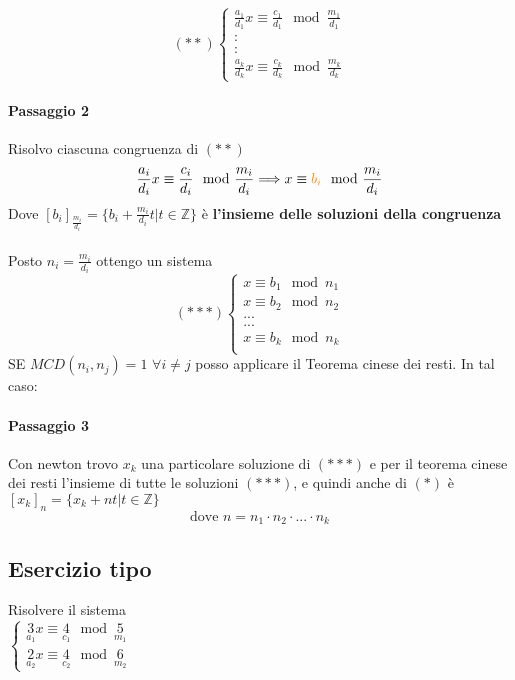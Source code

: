 $$(**)
\begin{cases}
    \frac{a_1}{d_1}x\equiv \frac{c_1}{d_1}\mod \frac{m_1}{d_1}\\
    :\\
    :\\
    \frac{a_k}{d_k}x\equiv \frac{c_k}{d_k}\mod \frac{m_k}{d_k}
\end{cases}
$$
\paragraph{Passaggio 2} Risolvo ciascuna congruenza di $(**)$ 
$$\frac{a_i}{d_i}x\equiv \frac{c_i}{d_i}\mod\frac{m_i}{d_i} \Longrightarrow x\equiv {\color{orange}b_i}\mod \frac{m_i}{d_i}$$
{\color{orange}
    Dove $[b_i]_{\frac{m_i}{d_i}}=\{ b_i+\frac{m_i}{d_i}t|t\in\mathbb{Z}\}$ è \textbf{l'insieme delle soluzioni della congruenza}
}\\\\
Posto $n_i=\frac{m_i}{d_i}$ ottengo un sistema
$$
(***)
\begin{cases}
    x\equiv b_1\mod n_1\\
    x\equiv b_2\mod n_2\\
    ...\\
    ...\\
    x\equiv b_k\mod n_k\\
\end{cases}
$$
{\color{red} SE} $MCD(n_i,n_j)=1$ $\forall i\neq j $ posso applicare il Teorema cinese dei resti. In tal caso:
\paragraph{Passaggio 3} Con newton trovo $x_k$ una particolare soluzione di $(***)$ e per il teorema cinese dei resti l'insieme di tutte le soluzioni $(***)$,
{\color{red} e quindi anche di $(*)$} è $[x_k]_n=\{x_k+nt|t\in\mathbb{Z}\}$\\
$$\textrm{dove }n=n_1\cdot n_2\cdot...\cdot n_k$$



\subsection{Esercizio tipo} Risolvere il sistema\\

$
\begin{cases}
    \underset{a_1}{3}x\equiv \underset{c_1}{4}\mod \underset{m_1}{5}\\
    \underset{a_2}{2}x\equiv \underset{c_2}{4}\mod \underset{m_2}{6}
\end{cases}
$

